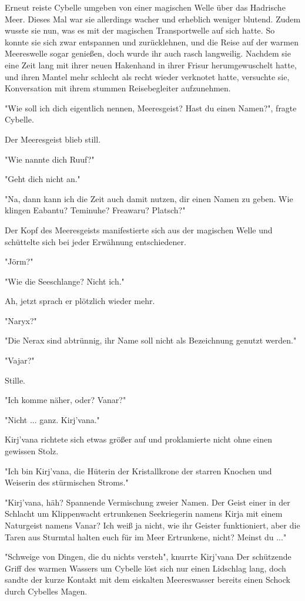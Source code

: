 Erneut reiste Cybelle umgeben von einer magischen Welle über das Hadrische Meer. Dieses Mal war sie allerdings wacher und erheblich weniger blutend. Zudem wusste sie nun, was es mit der magischen Transportwelle auf sich hatte. So konnte sie sich zwar entspannen und zurücklehnen, und die Reise auf der warmen Meereswelle sogar genießen, doch wurde ihr auch rasch langweilig. Nachdem sie eine Zeit lang mit ihrer neuen Hakenhand in ihrer Frisur herumgewuschelt hatte, und ihren Mantel mehr schlecht als recht wieder verknotet hatte, versuchte sie, Konversation mit ihrem stummen Reisebegleiter aufzunehmen.

"Wie soll ich dich eigentlich nennen, Meeresgeist? Hast du einen Namen?", fragte Cybelle.

Der Meeresgeist blieb still.

"Wie nannte dich Ruuf?"

"Geht dich nicht an."

"Na, dann kann ich die Zeit auch damit nutzen, dir einen Namen zu geben. Wie klingen Eabantu? Teminuhe? Freawaru? Platsch?"

Der Kopf des Meeresgeists manifestierte sich aus der magischen Welle und schüttelte sich bei jeder Erwähnung entschiedener.

"Jörm?"

"Wie die Seeschlange? Nicht ich."

Ah, jetzt sprach er plötzlich wieder mehr.

"Naryx?"

"Die Nerax sind abtrünnig, ihr Name soll nicht als Bezeichnung genutzt werden."

"Vajar?"

Stille.

"Ich komme näher, oder? Vanar?"

"Nicht ... ganz. Kirj'vana." 

Kirj'vana richtete sich etwas größer auf und proklamierte nicht ohne einen gewissen Stolz.

"Ich bin Kirj'vana, die Hüterin der Kristallkrone der starren Knochen und Weiserin des stürmischen Stroms."

"Kirj'vana, häh? Spannende Vermischung zweier Namen. Der Geist einer in der Schlacht um Klippenwacht ertrunkenen Seekriegerin namens Kirja mit einem Naturgeist namens Vanar? Ich weiß ja nicht, wie ihr Geister funktioniert, aber die Taren aus Sturmtal halten euch für im Meer Ertrunkene, nicht? Meinst du ..."

"Schweige von Dingen, die du nichts versteh", knurrte Kirj'vana Der schützende Griff des warmen Wassers um Cybelle löst sich nur einen Lidschlag lang, doch sandte der kurze Kontakt mit dem eiskalten Meereswasser bereits einen Schock durch Cybelles Magen.

